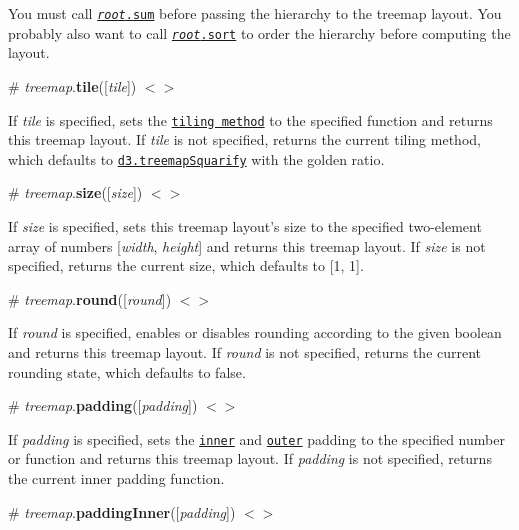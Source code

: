 You must call \href{#node_sum}{\tt {\itshape root}.sum} before passing the hierarchy to the treemap layout. You probably also want to call \href{#node_sort}{\tt {\itshape root}.sort} to order the hierarchy before computing the layout.

\label{_treemap_tile}%
\# {\itshape treemap}.{\bfseries tile}(\mbox{[}{\itshape tile}\mbox{]}) \href{https://github.com/d3/d3-hierarchy/blob/master/src/treemap/index.js#L61}{\tt $<$$>$}

If {\itshape tile} is specified, sets the \href{#treemap-tiling}{\tt tiling method} to the specified function and returns this treemap layout. If {\itshape tile} is not specified, returns the current tiling method, which defaults to \href{#treemapSquarify}{\tt d3.\+treemap\+Squarify} with the golden ratio.

\label{_treemap_size}%
\# {\itshape treemap}.{\bfseries size}(\mbox{[}{\itshape size}\mbox{]}) \href{https://github.com/d3/d3-hierarchy/blob/master/src/treemap/index.js#L57}{\tt $<$$>$}

If {\itshape size} is specified, sets this treemap layout’s size to the specified two-\/element array of numbers \mbox{[}{\itshape width}, {\itshape height}\mbox{]} and returns this treemap layout. If {\itshape size} is not specified, returns the current size, which defaults to \mbox{[}1, 1\mbox{]}.

\label{_treemap_round}%
\# {\itshape treemap}.{\bfseries round}(\mbox{[}{\itshape round}\mbox{]}) \href{https://github.com/d3/d3-hierarchy/blob/master/src/treemap/index.js#L53}{\tt $<$$>$}

If {\itshape round} is specified, enables or disables rounding according to the given boolean and returns this treemap layout. If {\itshape round} is not specified, returns the current rounding state, which defaults to false.

\label{_treemap_padding}%
\# {\itshape treemap}.{\bfseries padding}(\mbox{[}{\itshape padding}\mbox{]}) \href{https://github.com/d3/d3-hierarchy/blob/master/src/treemap/index.js#L65}{\tt $<$$>$}

If {\itshape padding} is specified, sets the \href{#treemap_paddingInner}{\tt inner} and \href{#treemap_paddingOuter}{\tt outer} padding to the specified number or function and returns this treemap layout. If {\itshape padding} is not specified, returns the current inner padding function.

\label{_treemap_paddingInner}%
\# {\itshape treemap}.{\bfseries padding\+Inner}(\mbox{[}{\itshape padding}\mbox{]}) \href{https://github.com/d3/d3-hierarchy/blob/master/src/treemap/index.js#L69}{\tt $<$$>$}

